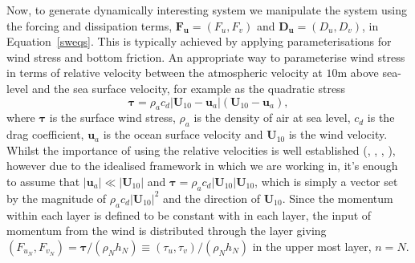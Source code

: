 \documentclass[12pt,a4paper]{report}
\newcommand*\equref[1]{Equation~\eqref{#1}}
\begin{document}
  Now, to generate dynamically interesting system we manipulate the system using 
  the forcing and
  dissipation terms, $\boldsymbol{F}_{\boldsymbol{u}} = \left(F_{u}, F_{v}\right)$ and $\boldsymbol{D}_{\boldsymbol{u}} = \left(D_{u}, D_{v}\right)$, in \equref{sweqs}.
  This is typically achieved by applying parameterisations for wind stress
  and bottom friction. An appropriate way to parameterise wind stress in terms of  
  relative velocity between the atmospheric velocity at $10 \mathrm{m}$ above sea-level
  and the sea surface velocity, for example as the quadratic stress
  \begin{equation}
  \boldsymbol{\tau}=\rho_{a} c_{d} \left|\boldsymbol{U}_{10}-\boldsymbol{u}_{a}\right|
  \left(\boldsymbol{U}_{10}-\boldsymbol{u}_{a}\right),
  \end{equation}
  where $\boldsymbol{\tau}$ is the surface wind stress, $\rho_{a}$ is the density of
  air at sea level, $c_{d}$ is the drag coefficient, $\boldsymbol{u}_{a}$ is the ocean
  surface velocity and $\boldsymbol{U}_{10}$ is the wind velocity.
  Whilst the importance of using the relative velocities is well established
  (\cite{duhaut2006wind}, \cite{zhai2007wind}, \cite{hughes2008wind}, \cite{zhai2012wind}), 
  however due to the idealised framework in which we are working in, it's enough
  to assume that $\left|\boldsymbol{u}_{a}\right| \ll \left|\boldsymbol{U}_{10}\right|$
  and $\boldsymbol{\tau}=\rho_{a} c_{d} \left|\boldsymbol{U}_{10}\right|
  \boldsymbol{U}_{10}$, which is simply a vector set by the 
  magnitude of $\rho_{a} c_{d} \left|\boldsymbol{U}_{10}\right|^{2}$ and the
  direction of $\boldsymbol{U}_{10}$. Since the momentum within each layer
  is defined to be constant with in each layer, the input of momentum from the wind
  is distributed through the layer giving $\left(F_{u_{N}},F_{v_{N}}\right)=\boldsymbol{\tau}/\left(\rho_{N}h_{N}\right) \equiv
  \left(\tau_{u},\tau_{v}\right)/\left(\rho_{N}h_{N}\right) $ in the
  upper most layer, $n=N$. 
  
\end{document}
